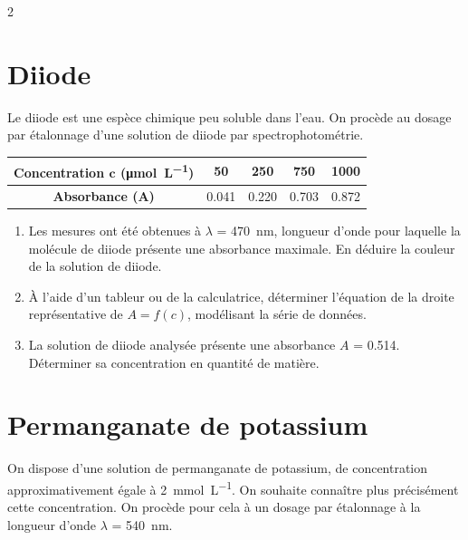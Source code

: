 \documentclass[a4paper,11pt,fleqn]{article}%
\begin{document}
\begin{multicols}{2}
\section{Diiode}
Le diiode  est une espèce chimique peu soluble dans l'eau. On procède au dosage par étalonnage d'une solution de diiode par spectrophotométrie.
\begin{table}[H]
    \centering \footnotesize
    \begin{tabular}{|c|c|c|c|c|}
        \hline
        \textbf{Concentration $\mathbf{c}$ (\unit{\micro\mole\per\liter})} & \num{50} & \num{250} & \num{750} & \num{1000}\\
        \hline\textbf{Absorbance (A)} & \num{0,041} & \num{0,220} & \num{0,703} & \num{0,872}\\
        \hline
    \end{tabular}
\end{table}
\begin{enumerate}
    \item Les mesures ont été obtenues à $\lambda$ = \SI{470}{nm}, longueur d'onde pour laquelle la molécule de diiode présente une absorbance maximale. En déduire la couleur de la solution de diiode.
    \item  À l'aide d'un tableur ou de la calculatrice, déterminer l'équation de la droite représentative de $A = f(c)$, modélisant la série de données.
    \item La solution de diiode analysée présente une absorbance $A$ = \num{0,514}. Déterminer sa concentration en quantité de matière.
\end{enumerate}

\section{Permanganate de potassium}
On dispose d'une solution de permanganate de potassium, de concentration approximativement égale à \SI{2}{\milli\mole\per\liter}. On souhaite connaître plus précisément cette concentration. On procède pour cela à un dosage par étalonnage à la longueur d'onde $\lambda$ = \SI{540}{nm}.


\end{multicols}
\end{document}
